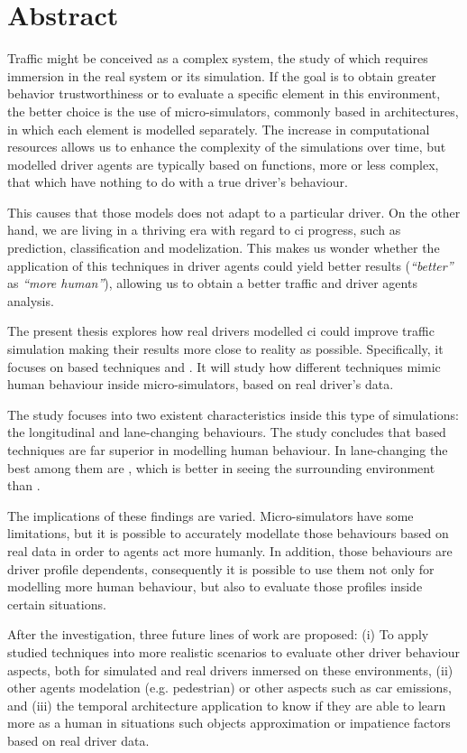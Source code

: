 \cleardoublepage
\thispagestyle{empty}
\chapter*{Abstract}
\begin{fullwidth}
	Traffic might be conceived as a complex system, the study of which requires immersion in the real system or its simulation. If the goal is to obtain greater behavior trustworthiness or to evaluate a specific element in this environment, the better choice is the use of micro-simulators, commonly based in  architectures, in which each element is modelled separately. The increase in computational resources allows us to enhance the complexity of the simulations over time, but modelled driver agents are typically based on functions, more or less complex, that which have nothing to do with a true driver’s behaviour. 
	
	This causes that those models does not adapt to a particular driver. On the other hand, we are living in a thriving era with regard to \acrlong{ci} progress, such as prediction, classification and modelization. This makes us wonder whether the application of this techniques in driver agents could yield better results (\textit{\enquote{better}} as \textit{\enquote{more human}}), allowing us to obtain a better traffic and driver agents analysis.
	
	The present thesis explores how real drivers modelled \acrlong{ci} could improve traffic simulation making their results more close to reality as possible. Specifically, it focuses on  based techniques and . It will study how different techniques mimic human behaviour inside micro-simulators, based on real driver’s data.
	
	The study focuses into two existent characteristics inside this type of simulations: the longitudinal and lane-changing behaviours. The study concludes that  based techniques are far superior in modelling human behaviour. In lane-changing the best among them are , which is better in seeing the surrounding environment than .
	
	The implications of these findings are varied. Micro-simulators have some limitations, but it is possible to accurately modellate those behaviours based on real data in order to agents act more humanly. In addition, those behaviours are driver profile dependents, consequently it is possible to use them not only for modelling more human behaviour, but also to evaluate those profiles inside certain situations.
	
	After the investigation, three future lines of work are proposed: (i) To apply studied techniques into more realistic scenarios to evaluate other driver behaviour aspects, both for simulated and real drivers inmersed on these environments, (ii) other agents modelation (e.g. pedestrian) or other aspects such as car emissions, and (iii) the  temporal architecture application to know if they are able to learn more as a human in situations such objects approximation or impatience factors based on real driver data.
\end{fullwidth}